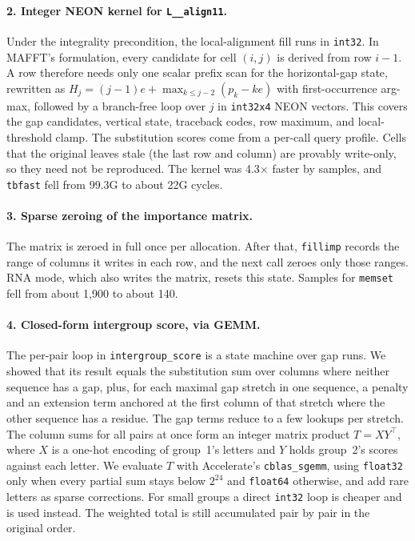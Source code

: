 \documentclass[11pt]{article}
\newcommand{\code}[1]{\texttt{#1}}
\begin{document}
\paragraph{2. Integer NEON kernel for \code{L\_\_align11}.} Under the integrality
precondition, the local-alignment fill runs in \code{int32}. In MAFFT's formulation, every
candidate for cell $(i,j)$ is derived from row $i{-}1$. A row therefore needs only one
scalar prefix scan for the horizontal-gap state, rewritten as
$H_j = (j{-}1)e + \max_{k\le j-2}(p_k - k e)$ with first-occurrence arg-max, followed by a
branch-free loop over $j$ in \code{int32x4} NEON vectors. This covers the gap candidates,
vertical state, traceback codes, row maximum, and local-threshold clamp. The substitution
scores come from a per-call query profile. Cells that the original leaves stale (the last
row and column) are provably write-only, so they need not be reproduced. The kernel was
4.3$\times$ faster by samples, and \code{tbfast} fell from 99.3G to about 22G cycles.

\paragraph{3. Sparse zeroing of the importance matrix.} The matrix is zeroed in full once
per allocation. After that, \code{fillimp} records the range of columns it writes in each
row, and the next call zeroes only those ranges. RNA mode, which also writes the matrix,
resets this state. Samples for \code{memset} fell from about 1{,}900 to about 140.

\paragraph{4. Closed-form intergroup score, via GEMM.} The per-pair loop in
\code{intergroup\_score} is a state machine over gap runs. We showed that its result equals
the substitution sum over columns where neither sequence has a gap, plus, for each maximal
gap stretch in one sequence, a penalty and an extension term anchored at the first column
of that stretch where the other sequence has a residue. The gap terms reduce to a few
lookups per stretch. The column sums for all pairs at once form an integer matrix product
$T = XY^{\top}$, where $X$ is a one-hot encoding of group~1's letters and $Y$ holds group~2's
scores against each letter. We evaluate $T$ with Accelerate's \code{cblas\_sgemm}, using
\code{float32} only when every partial sum stays below $2^{24}$ and \code{float64}
otherwise, and add rare letters as sparse corrections. For small groups a direct
\code{int32} loop is cheaper and is used instead. The weighted total is still accumulated
pair by pair in the original order.
\end{document}
